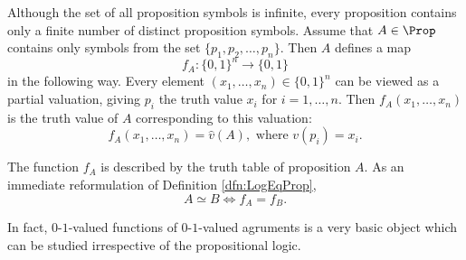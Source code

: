 

\setcounter{section}{1}
\setcounter{subsection}{4}
\setcounter{dfn}{10}

Although the set of all proposition symbols is infinite,
every proposition contains only a finite number of distinct proposition symbols.
Assume that $A \in \Prop$ contains only symbols from the set $\{p_1, p_2, \ldots, p_n\}$.
Then $A$ defines a map
\[
f_A \colon \{0,1\}^n \to \{0,1\}
\]
in the following way.
Every element $(x_1, \ldots, x_n) \in \{0,1\}^n$ can be viewed as a partial valuation, giving $p_i$ the truth value $x_i$ for $i = 1, \ldots, n$.
Then $f_A(x_1, \ldots, x_n)$ is the truth value of $A$ corresponding to this valuation:
\[
f_A(x_1, \ldots, x_n) = \hat{v}(A), \text{ where } v(p_i) = x_i.
\]

The function $f_A$ is described by the truth table of proposition $A$.
As an immediate reformulation of Definition \ref{dfn:LogEqProp},
\[
A \simeq B \Leftrightarrow f_A = f_B.
\]

In fact, $0$-$1$-valued functions of $0$-$1$-valued agruments is a very basic object which can be studied irrespective of the propositional logic.


